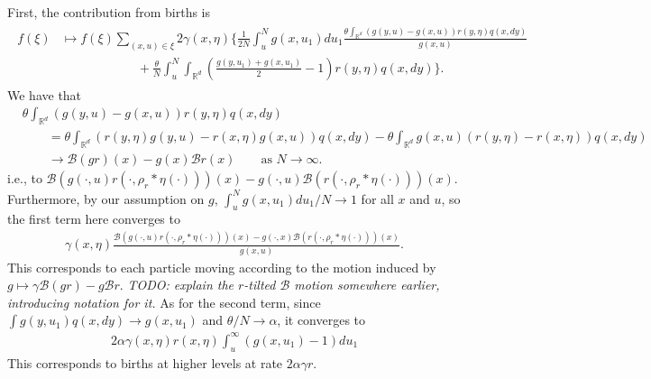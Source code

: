 \documentclass[12pt]{article}
\newcommand{\IR}{\mathbb R}
\newcommand{\DG}{\mathcal{B}}  %
\newcommand{\kernel}{\rho}  %
\newcommand{\smooth}[1]{\kernel_{#1} \! * \!}  %
\newcommand{\lp}{\xi}              %
\newcommand{\comment}[1]{{\color{blue} \it #1}}
\begin{document}
First, the contribution from births is
\begin{align*}
\begin{split}
f(\lp)
&\mapsto
    f(\lp)
    \sum_{(x, u) \in \lp}
    2 \gamma(x, \eta)
    \bigg\{
        \frac{1}{2 N}
        \int_u^N
        g(x, u_1) du_1
        \frac{
            \theta \int_{\IR^d} (g(y, u) - g(x, u)) r(y, \eta) q(x, dy)
        }{
            g(x, u)
        }
    \\ & \qquad \qquad \qquad {}
        + \frac{\theta}{N}
        \int_u^N \int_{\IR^d}
        \left( \frac{g(y, u_1) + g(x, u_1)}{2} - 1 \right)
        r(y, \eta) q(x, dy)
    \bigg\}
    .
    \end{split}
\end{align*}
We have that
\begin{align*}
    &\theta \int_{\IR^d} (g(y, u) - g(x, u)) r(y, \eta) q(x, dy) \\
    &\qquad =
    \theta \int_{\IR^d} (r(y, \eta) g(y, u) - r(x, \eta) g(x, u)) q(x, dy)
    - \theta \int_{\IR^d} g(x, u) (r(y, \eta) - r(x, \eta)) q(x, dy) \\
    &\qquad \to
    \DG(gr)(x) - g(x) \DG r(x) \qquad \text{as }N \to \infty.
\end{align*}
i.e., to
$\DG\left(g(\cdot, u) r(\cdot, \smooth{r}\eta(\cdot))\right)(x)
- g(\cdot, u) \DG\left(r(\cdot, \smooth{r}\eta(\cdot))\right)(x)$.
Furthermore, by our assumption on $g$,
$\int_u^N g(x, u_1) du_1 / N \to 1$ for all $x$ and $u$,
so the first term here converges to
\begin{align*}
    \gamma(x, \eta)
        \frac{
            \DG\left( g(\cdot, u) r(\cdot, \smooth{r}\eta(\cdot))\right)(x)
            -
            g(\cdot, x) \DG\left( r(\cdot, \smooth{r}\eta(\cdot))\right)(x)
        }{
            g(x, u)
        } .
\end{align*}
This corresponds to each particle moving according to the motion induced by
$g \mapsto \gamma \DG(gr) - g \DG r$.
\comment{TODO: explain the $r$-tilted $\DG$ motion somewhere earlier, introducing notation for it.}
As for the second term,
since $\int g(y, u_1) q(x, dy) \to g(x, u_1)$
and $\theta/N \to \alpha$,
it converges to
\begin{align*}
    2 \alpha
    \gamma(x, \eta)
    r(x, \eta) 
    \int_u^\infty
    \left( g(x, u_1) - 1 \right)
    du_1
\end{align*}
This corresponds to births at higher levels at rate $2 \alpha \gamma r$.
\end{document}
